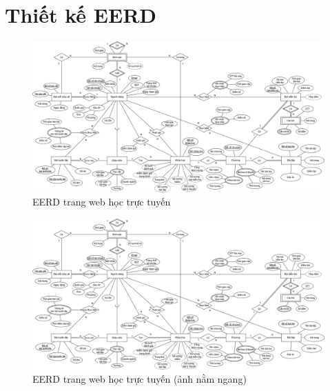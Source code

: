 \section{Thiết kế EERD}
\begin{figure}[H]
    \centering
    \includegraphics[width=1\linewidth]{picture/ERD.drawio.png}
    \caption{EERD trang web học trực tuyến}
    \label{fig:placeholder}
\end{figure}
\newpage
\begin{figure}[H]
    \centering
    \includegraphics[angle=-90, width=0.7\linewidth]{picture/ERD.drawio.png}
    \caption{EERD trang web học trực tuyến (ảnh nằm ngang)}
    \label{fig:placeholder}
\end{figure}